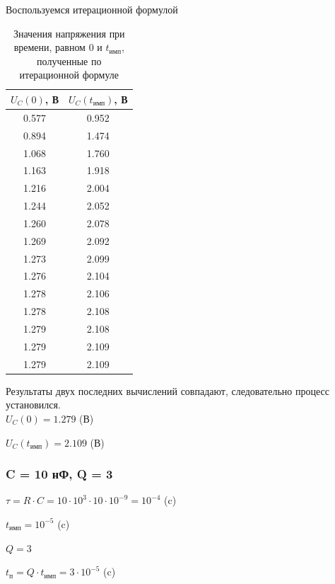 	Воспользуемся итерационной формулой
\begin{table}[H]

	\begin{center}
	\caption{Значения напряжения при времени, равном $0$ и $t_\text{имп}$, полученные по итерационной формуле}
	\begin{tabular}{|c|c|}
		\hline 
		$U_C(0)$, В & $U_C(t_\text{имп})$, В \\ 
		\hline 
		0.577 & 0.952 \\ 
		\hline 
		0.894 & 1.474 \\ 
		\hline 
		1.068 & 1.760 \\ 
		\hline 
		1.163 & 1.918 \\ 
		\hline 
		1.216 & 2.004 \\ 
		\hline 
		1.244 & 2.052 \\ 
		\hline 
		1.260 & 2.078 \\ 
		\hline 
		1.269 & 2.092 \\ 
		\hline 
		1.273 & 2.099 \\ 
		\hline 
		1.276 & 2.104 \\ 
		\hline 
		1.278 & 2.106 \\ 
		\hline 
		1.278 & 2.108 \\ 
		\hline 
		1.279 & 2.108 \\ 
		\hline 
		1.279 & 2.109 \\ 
		\hline 
		1.279 & 2.109 \\ 
		\hline 
		\end{tabular} 	
		
	\end{center}
\end{table}
	Результаты двух последних вычислений совпадают, следовательно процесс установился.\\
	
	$U_C(0) = 1.279$ (В)	
	
	$U_C(t_\text{имп}) = 2.109$ (В)
	

\subsubsection{C = 10 нФ, Q = 3}

$\tau = R \cdot C = 10 \cdot 10^3 \cdot 10 \cdot 10^{-9} = 10^{-4}$ (c)
		
		$t_\text{имп} = 10^{-5}$ (c)
		
		$Q = 3$
		
		$t_\text{п} = Q \cdot t_\text{имп} = 3 \cdot 10^{-5}$ (c)
		

